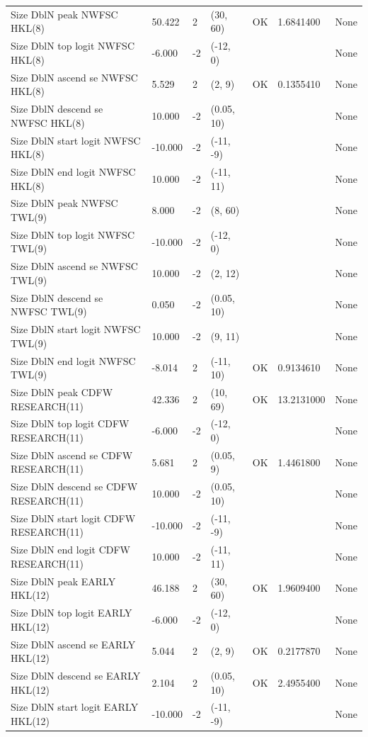 \documentclass[11pt,
  english,
  a4paper,
]{article}
\begin{document}
\begin{landscape}
\begin{longtable}[t]{>{\raggedright\arraybackslash}p{8.5cm}lllll>{\raggedright\arraybackslash}p{4cm}}
Size DblN peak NWFSC HKL(8) & 50.422 & 2 & (30, 60) & OK & 1.6841400 & None\\
Size DblN top logit NWFSC HKL(8) & -6.000 & -2 & (-12, 0) &  &  & None\\
Size DblN ascend se NWFSC HKL(8) & 5.529 & 2 & (2, 9) & OK & 0.1355410 & None\\
Size DblN descend se NWFSC HKL(8) & 10.000 & -2 & (0.05, 10) &  &  & None\\
Size DblN start logit NWFSC HKL(8) & -10.000 & -2 & (-11, -9) &  &  & None\\
Size DblN end logit NWFSC HKL(8) & 10.000 & -2 & (-11, 11) &  &  & None\\
Size DblN peak NWFSC TWL(9) & 8.000 & -2 & (8, 60) &  &  & None\\
Size DblN top logit NWFSC TWL(9) & -10.000 & -2 & (-12, 0) &  &  & None\\
Size DblN ascend se NWFSC TWL(9) & 10.000 & -2 & (2, 12) &  &  & None\\
Size DblN descend se NWFSC TWL(9) & 0.050 & -2 & (0.05, 10) &  &  & None\\
Size DblN start logit NWFSC TWL(9) & 10.000 & -2 & (9, 11) &  &  & None\\
Size DblN end logit NWFSC TWL(9) & -8.014 & 2 & (-11, 10) & OK & 0.9134610 & None\\
Size DblN peak CDFW RESEARCH(11) & 42.336 & 2 & (10, 69) & OK & 13.2131000 & None\\
Size DblN top logit CDFW RESEARCH(11) & -6.000 & -2 & (-12, 0) &  &  & None\\
Size DblN ascend se CDFW RESEARCH(11) & 5.681 & 2 & (0.05, 9) & OK & 1.4461800 & None\\
Size DblN descend se CDFW RESEARCH(11) & 10.000 & -2 & (0.05, 10) &  &  & None\\
Size DblN start logit CDFW RESEARCH(11) & -10.000 & -2 & (-11, -9) &  &  & None\\
Size DblN end logit CDFW RESEARCH(11) & 10.000 & -2 & (-11, 11) &  &  & None\\
Size DblN peak EARLY HKL(12) & 46.188 & 2 & (30, 60) & OK & 1.9609400 & None\\
Size DblN top logit EARLY HKL(12) & -6.000 & -2 & (-12, 0) &  &  & None\\
Size DblN ascend se EARLY HKL(12) & 5.044 & 2 & (2, 9) & OK & 0.2177870 & None\\
Size DblN descend se EARLY HKL(12) & 2.104 & 2 & (0.05, 10) & OK & 2.4955400 & None\\
Size DblN start logit EARLY HKL(12) & -10.000 & -2 & (-11, -9) &  &  & None\\

\end{longtable}
\end{landscape}
\end{document}
